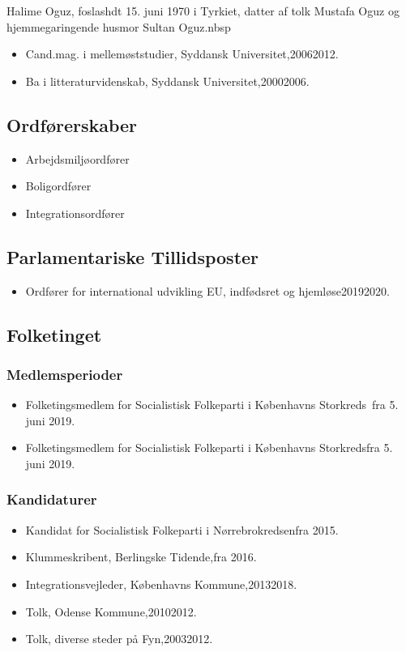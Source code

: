 \documentclass[11pt, a4paper]{awesome-cv}
\begin{document}
\makecvheader[R]
\makelettertitle
\begin{cvletter}
Halime Oguz, foslashdt 15. juni 1970 i Tyrkiet, datter af tolk Mustafa Oguz og hjemmegaringende husmor Sultan Oguz.nbsp

\begin{itemize}
\item Cand.mag. i mellemøststudier, Syddansk Universitet,20062012.
\item Ba i litteraturvidenskab, Syddansk Universitet,20002006.
\end{itemize}
\subsection*{Ordførerskaber}
\begin{itemize}
\item Arbejdsmiljøordfører
\item Boligordfører
\item Integrationsordfører
\end{itemize}
\subsection*{Parlamentariske Tillidsposter}
\begin{itemize}
\item Ordfører for international udvikling EU, indfødsret og hjemløse20192020.
\end{itemize}
\subsection*{Folketinget}
\subsubsection*{Medlemsperioder}
\begin{itemize}
\item Folketingsmedlem for Socialistisk Folkeparti i Københavns Storkreds fra 5. juni 2019.
\item Folketingsmedlem for Socialistisk Folkeparti i Københavns Storkredsfra 5. juni 2019.
\end{itemize}
\subsubsection*{Kandidaturer}
\begin{itemize}
\item Kandidat for Socialistisk Folkeparti i Nørrebrokredsenfra 2015.
\end{itemize}
\begin{itemize}
\item Klummeskribent, Berlingske Tidende,fra 2016.
\item Integrationsvejleder, Københavns Kommune,20132018.
\item Tolk, Odense Kommune,20102012.
\item Tolk, diverse steder på Fyn,20032012.
\end{itemize}
\end{cvletter}
\end{document}
